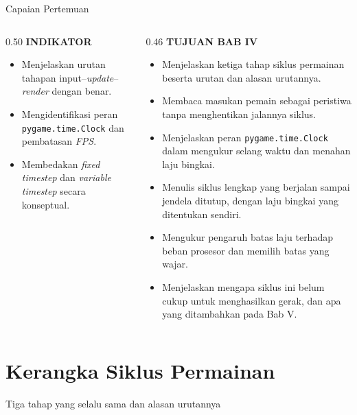 \documentclass[aspectratio=169,10pt]{beamer}
\begin{document}
\begin{frame}{Capaian Pertemuan}
\begin{columns}[T,onlytextwidth]
\begin{column}{0.50\textwidth}
    {\fontsize{7}{8.5}\selectfont\bfseries\color{ubAccent}INDIKATOR}\par
    \vspace{0.06cm}
    \begin{itemize}
      \item Menjelaskan urutan tahapan input--\emph{update}--\emph{render}
            dengan benar.
      \item Mengidentifikasi peran \texttt{pygame.time.Clock} dan pembatasan
            \emph{FPS}.
      \item Membedakan \emph{fixed timestep} dan \emph{variable timestep}
            secara konseptual.
    \end{itemize}
  \end{column}
  \begin{column}{0.46\textwidth}
    {\fontsize{7}{8.5}\selectfont\bfseries\color{ubAccent}TUJUAN BAB IV}\par
    \vspace{0.06cm}
    \begin{itemize}
      \item Menjelaskan ketiga tahap siklus permainan beserta urutan dan
            alasan urutannya.
      \item Membaca masukan pemain sebagai peristiwa tanpa menghentikan
            jalannya siklus.
      \item Menjelaskan peran \texttt{pygame.time.Clock} dalam mengukur selang
            waktu dan menahan laju bingkai.
      \item Menulis siklus lengkap yang berjalan sampai jendela ditutup,
            dengan laju bingkai yang ditentukan sendiri.
      \item Mengukur pengaruh batas laju terhadap beban prosesor dan memilih
            batas yang wajar.
      \item Menjelaskan mengapa siklus ini belum cukup untuk menghasilkan
            gerak, dan apa yang ditambahkan pada Bab V.
    \end{itemize}
  \end{column}
\end{columns}
\end{frame}

\section{Kerangka Siklus Permainan}
  {Tiga tahap yang selalu sama dan alasan urutannya}
\end{document}
